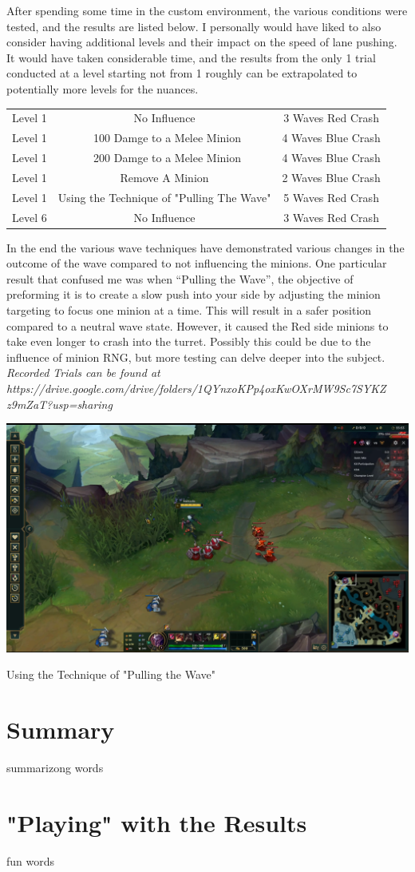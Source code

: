 \documentclass{article}
\begin{document}
After spending some time in the custom environment, the various conditions were tested, and the results are listed below. I personally would have liked to also consider having additional levels and their impact on the speed of lane pushing. It would have taken considerable time, and the results from the only 1 trial conducted at a level starting not from 1 roughly can be extrapolated to potentially more levels for the nuances.
\begin{center}
\begin{tabular}{ c c c}
  Level 1 & No Influence & 3 Waves Red Crash\\ 
  Level 1 & ~100 Damge to  a Melee Minion & 4 Waves Blue Crash\\  
  Level 1 & ~200 Damge to  a Melee Minion & 4 Waves Blue Crash\\  
  Level 1 & Remove A Minion & 2 Waves Blue Crash\\  
  Level 1 & Using the Technique of "Pulling The Wave"  & 5 Waves Red Crash\\
  Level 6 & No Influence  & 3 Waves Red Crash
\end{tabular}
\end{center}
In the end the various wave techniques have demonstrated various changes in the outcome of the wave compared to not influencing the minions. One particular result that confused me was when “Pulling the Wave”, the objective of preforming it is to create a slow push into your side by adjusting the minion targeting to focus one minion at a time. This will result in a safer position compared to a neutral wave state. However, it caused the Red side minions to take even longer to crash into the turret. Possibly this could be due to the influence of minion RNG, but more testing can delve deeper into the subject.
\textit{Recorded Trials can be found at https://drive.google.com/drive/folders/1QYnxoKPp4oxKwOXrMW9Sc7SYKZ\\z9mZaT?usp=sharing}
\begin{table}[h]
  \includegraphics[width=\textwidth]{PullingTheWave.PNG}
  \caption[Pulling the Wave]{Using the Technique of "Pulling the Wave"}
  \end{table}

\newpage
\section{Summary}
summarizong words\\


\newpage
\section{"Playing" with the Results}
fun words
\end{document}
